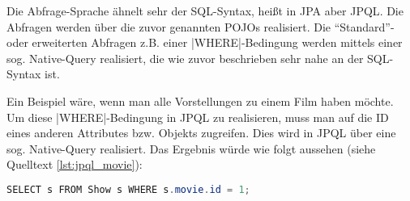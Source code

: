 Die Abfrage-Sprache ähnelt sehr der \acs{SQL}-Syntax, heißt in \ac{JPA} aber \acf{JPQL}.
Die Abfragen werden über die zuvor genannten \acsp{POJO} realisiert.
Die \enquote{Standard}- oder erweiterten Abfragen z.B. einer \sinline|WHERE|-Bedingung werden mittels einer sog. Native-Query realisiert, die wie zuvor beschrieben sehr nahe an der \acs{SQL}-Syntax ist.

Ein Beispiel wäre, wenn man alle Vorstellungen zu einem Film haben möchte.
Um diese \sinline|WHERE|-Bedingung in \acs{JPQL} zu realisieren, muss man auf die ID eines anderen Attributes bzw. Objekts zugreifen.
Dies wird in \acs{JPQL} über eine sog. Native-Query realisiert.
Das Ergebnis würde wie folgt aussehen (siehe Quelltext \vref{lst:jpql_movie}):

\begin{lstlisting}[language=JAVA, morekeywords={SELECT,FROM,WHERE}, caption={\acs{JPQL}-Abfrage aller Vorstellungen, bei denen die Film-ID 1 ist}, label={lst:jpql_movie}]
SELECT s FROM Show s WHERE s.movie.id = 1;
\end{lstlisting}
